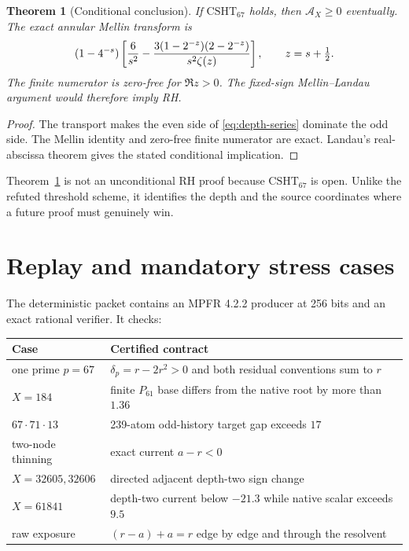 \documentclass[11pt]{article}
\newtheorem{theorem}{Theorem}[section]
\newcommand{\Acal}{\mathcal A}
\newcommand{\CSHT}{\mathrm{CSHT}_{67}}
\begin{document}
\begin{theorem}[Conditional conclusion]\label{thm:conditional}
If $\CSHT$ holds, then $\Acal_X\ge0$ eventually.  The exact annular Mellin
transform is
\[
 (1-4^{-s})\left[
 {6\over s^2}
 -{3(1-2^{-z})(2-2^{-z})\over s^2\zeta(z)}
 \right],
 \qquad z=s+\tfrac12.
\]
The finite numerator is zero-free for $\Re z>0$.  The fixed-sign
Mellin--Landau argument would therefore imply RH.
\end{theorem}

\begin{proof}
The transport makes the even side of \eqref{eq:depth-series} dominate the odd
side.  The Mellin identity and zero-free finite numerator are exact.  Landau's
real-abscissa theorem gives the stated conditional implication.
\end{proof}

Theorem~\ref{thm:conditional} is not an unconditional RH proof because $\CSHT$
is open.  Unlike the refuted threshold scheme, it identifies the depth and the
source coordinates where a future proof must genuinely win.

\section{Replay and mandatory stress cases}

The deterministic packet contains an MPFR 4.2.2 producer at 256 bits and an
exact rational verifier.  It checks:
\begin{center}
\begin{tabular}{p{}p{}}
\toprule
Case & Certified contract\\
\midrule
one prime $p=67$ & $\delta_p=r-2r^2>0$ and both residual conventions sum to $r$\\
$X=184$ & finite $P_{61}$ base differs from the native root by more than $1.36$\\
$67\cdot71\cdot13$ & 239-atom odd-history target gap exceeds $17$\\
two-node thinning & exact current $a-r<0$\\
$X=32605,32606$ & directed adjacent depth-two sign change\\
$X=61841$ & depth-two current below $-21.3$ while native scalar exceeds $9.5$\\
raw exposure & $(r-a)+a=r$ edge by edge and through the resolvent\\
\bottomrule
\end{tabular}
\end{center}
\end{document}
